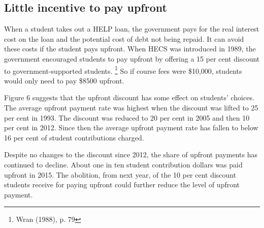 \documentclass[embargoed]{grattan}
\begin{document}
\subsection{\texorpdfstring{\protect\hypertarget{_Ref333152519}{}{\protect\hypertarget{_Ref335384889}{}{\protect\hypertarget{_Ref333848257}{}{}}}Little incentive to pay upfront }{Little incentive to pay upfront }}\label{little-incentive-to-pay-upfront}

When a student takes out a HELP loan, the government pays for the real interest cost on the loan and the potential cost of debt not being repaid.
It can avoid these costs if the student pays upfront.
When HECS was introduced in 1989, the government encouraged students to pay upfront by offering a 15 per cent discount to government-supported students.%
\footnote{Wran (1988), p. 79} So if course fees were \$10,000, students would only need to pay \$8500 upfront.

Figure 6 suggests that the upfront discount has some effect on students' choices.
The average upfront payment rate was highest when the discount was lifted to 25 per cent in 1993.
The discount was reduced to 20 per cent in 2005 and then 10 per cent in 2012.
Since then the average upfront payment rate has fallen to below 16 per cent of student contributions charged.

Despite no changes to the discount since 2012, the share of upfront payments has continued to decline.
About one in ten student contribution dollars was paid upfront in 2015.
The abolition, from next year, of the 10 per cent discount students receive for paying upfront could further reduce the level of upfront payment.
\end{document}
